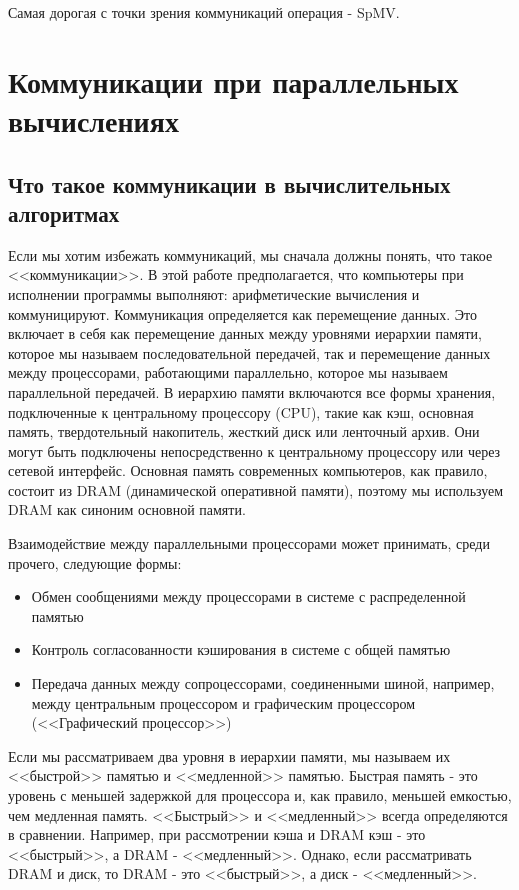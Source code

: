\documentclass[a4paper,12pt]{report}
\begin{document}
    Самая дорогая с точки зрения коммуникаций операция - SpMV. 
    
    \chapter{ Коммуникации при параллельных вычислениях}

    \section{Что такое коммуникации в вычислительных алгоритмах}
    Если мы хотим избежать коммуникаций, мы сначала должны понять, что такое <<коммуникации>>. В этой работе предполагается, что компьютеры при исполнении программы выполняют: арифметические вычисления и коммуницируют. Коммуникация определяется как перемещение данных. Это включает в себя как перемещение данных между уровнями иерархии памяти, которое мы называем последовательной передачей, так и перемещение данных между процессорами, работающими параллельно, которое мы называем параллельной передачей. В иерархию памяти включаются все формы хранения, подключенные к центральному процессору (CPU), такие как кэш, основная память, твердотельный накопитель, жесткий диск или ленточный архив. Они могут быть подключены непосредственно к центральному процессору или через сетевой интерфейс. Основная память современных компьютеров, как правило, состоит из DRAM (динамической оперативной памяти), поэтому мы используем DRAM как синоним основной памяти.      

    Взаимодействие между параллельными процессорами может принимать, среди прочего, следующие формы: 
    \begin{itemize}
        \item Обмен сообщениями между процессорами в системе с распределенной памятью
        \item Контроль согласованности кэширования в системе с общей памятью
        \item Передача данных между сопроцессорами, соединенными шиной, например, между центральным процессором и графическим процессором (<<Графический процессор>>)
    \end{itemize}

    Если мы рассматриваем два уровня в иерархии памяти, мы называем их <<быстрой>> памятью и <<медленной>> памятью. Быстрая память - это уровень с меньшей задержкой для процессора и, как правило, меньшей емкостью, чем медленная память. <<Быстрый>> и <<медленный>> всегда определяются в сравнении. Например, при рассмотрении кэша и DRAM кэш - это <<быстрый>>, а DRAM - <<медленный>>. Однако, если рассматривать DRAM и диск, то DRAM - это <<быстрый>>, а диск - <<медленный>>.
    
\end{document}

